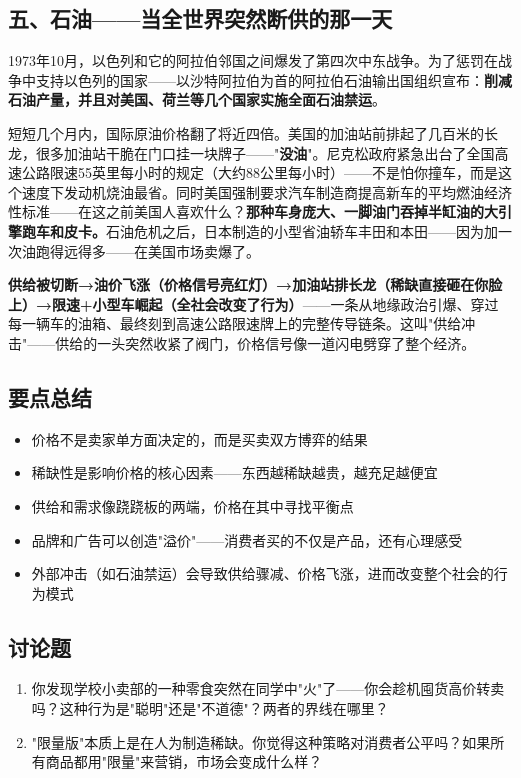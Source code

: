 \documentclass[a4paper,12pt]{ctexart}
\begin{document}
\subsection*{五、石油——当全世界突然断供的那一天}

1973年10月，以色列和它的阿拉伯邻国之间爆发了第四次中东战争。为了惩罚在战争中支持以色列的国家——以沙特阿拉伯为首的阿拉伯石油输出国组织宣布：\textbf{削减石油产量，并且对美国、荷兰等几个国家实施全面石油禁运}。

短短几个月内，国际原油价格翻了将近四倍。美国的加油站前排起了几百米的长龙，很多加油站干脆在门口挂一块牌子——"\textbf{没油}"。尼克松政府紧急出台了全国高速公路限速55英里每小时的规定（大约88公里每小时）——不是怕你撞车，而是这个速度下发动机烧油最省。同时美国强制要求汽车制造商提高新车的平均燃油经济性标准——在这之前美国人喜欢什么？\:\textbf{那种车身庞大、一脚油门吞掉半缸油的大引擎跑车和皮卡。}石油危机之后，日本制造的小型省油轿车丰田和本田——因为加一次油跑得远得多——在美国市场卖爆了。

\textbf{供给被切断→油价飞涨（价格信号亮红灯）→加油站排长龙（稀缺直接砸在你脸上）→限速+小型车崛起（全社会改变了行为）}\:——\:一条从地缘政治引爆、穿过每一辆车的油箱、最终刻到高速公路限速牌上的完整传导链条。这叫"供给冲击"——供给的一头突然收紧了阀门，价格信号像一道闪电劈穿了整个经济。

\subsection*{要点总结}
\begin{itemize}
  \item 价格不是卖家单方面决定的，而是买卖双方博弈的结果
  \item 稀缺性是影响价格的核心因素——东西越稀缺越贵，越充足越便宜
  \item 供给和需求像跷跷板的两端，价格在其中寻找平衡点
  \item 品牌和广告可以创造"溢价"——消费者买的不仅是产品，还有心理感受
  \item 外部冲击（如石油禁运）会导致供给骤减、价格飞涨，进而改变整个社会的行为模式
\end{itemize}

\subsection*{讨论题}
\begin{enumerate}
  \item 你发现学校小卖部的一种零食突然在同学中"火"了——你会趁机囤货高价转卖吗？这种行为是"聪明"还是"不道德"？两者的界线在哪里？
  \item "限量版"本质上是在人为制造稀缺。你觉得这种策略对消费者公平吗？如果所有商品都用"限量"来营销，市场会变成什么样？
\end{enumerate}
\end{document}
